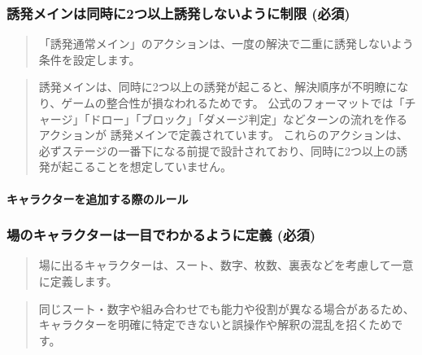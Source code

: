 \documentclass[letterpaper,10pt,dvipdfmx]{sphinxmanual}
\begin{document}
\subsubsection{誘発\textendash{}メインは同時に2つ以上誘発しないように制限 (必須)}
\label{\detokenize{appendix/guideline/customRule:id8}}
\sphinxAtStartPar
{}
\begin{quote}

\sphinxAtStartPar
「誘発\textendash{}通常\textendash{}メイン」のアクションは、一度の解決で二重に誘発しないよう条件を設定します。
\end{quote}

\sphinxAtStartPar
{}
\begin{quote}

\sphinxAtStartPar
誘発\textendash{}メインは、同時に2つ以上の誘発が起こると、解決順序が不明瞭になり、ゲームの整合性が損なわれるためです。
公式のフォーマットでは「チャージ」「ドロー」「ブロック」「ダメージ判定」などターンの流れを作るアクションが 誘発\textendash{}メインで定義されています。
これらのアクションは、必ずステージの一番下になる前提で設計されており、同時に2つ以上の誘発が起こることを想定していません。
\end{quote}


\paragraph{キャラクターを追加する際のルール}
\label{\detokenize{appendix/guideline/customRule:id9}}

\subsubsection{場のキャラクターは一目でわかるように定義 (必須)}
\label{\detokenize{appendix/guideline/customRule:id10}}
\sphinxAtStartPar
{}
\begin{quote}

\sphinxAtStartPar
場に出るキャラクターは、スート、数字、枚数、裏表などを考慮して一意に定義します。
\end{quote}

\sphinxAtStartPar
{}
\begin{quote}

\sphinxAtStartPar
同じスート・数字や組み合わせでも能力や役割が異なる場合があるため、キャラクターを明確に特定できないと誤操作や解釈の混乱を招くためです。
\end{quote}

\sphinxstepscope
\end{document}
